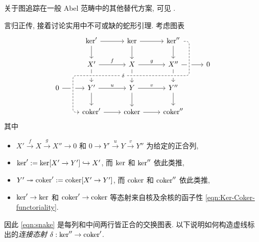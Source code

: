 关于图追踪在一般 Abel 范畴中的其他替代方案, 可见 \cite[Tag 05PL]{stacks}.

言归正传, 接着讨论实用中不可或缺的蛇形引理. 考虑图表
\begin{equation}\label{eqn:snake}\begin{tikzcd}
	& \Ker' \arrow[r] \arrow[d] & \Ker \arrow[r] \arrow[d] & \Ker'' \arrow[d] & \\
	& X' \arrow[d] \arrow[r, "f"]  & X \arrow[d] \arrow[r, "g"]  & X'' \arrow[r] \arrow[d, ""{coordinate, name=Z}] & 0  \\
	0 \arrow[r] & Y' \arrow[r, "u"] \arrow[d] & Y \arrow[r, "v"] \arrow[d] & Y'' \arrow[d] & \\
	& \Coker' \arrow[uuurr, "\delta" description, crossing over, dashed, leftarrow, rounded corners, to path= {-- ([xshift=-2ex]\tikztostart.west) |- (Z) [near end]\tikztonodes -| ([xshift=2ex]\tikztotarget.east) -- (\tikztotarget) } ] \arrow[r] & \Coker \arrow[r] & \Coker'' &
\end{tikzcd}\end{equation}
其中
\begin{itemize}
	\item $X' \xrightarrow{f} X \xrightarrow{g} X'' \to 0$ 和 $0 \to Y' \xrightarrow{u} Y \xrightarrow{v} Y''$ 为给定的正合列,
	\item $\operatorname{ker}' := \operatorname{ker}[X' \to Y'] \hookrightarrow X'$, 而 $\operatorname{ker}$ 和 $\operatorname{ker}''$ 依此类推,
	\item $Y' \twoheadrightarrow \operatorname{coker}' := \operatorname{coker}[X' \to Y']$, 而 $\operatorname{coker}$ 和 $\operatorname{coker}''$ 依此类推,
	\item $\operatorname{ker}' \to \operatorname{ker}$ 和 $\operatorname{coker}' \to \operatorname{coker}$ 等态射来自核及余核的函子性 \eqref{eqn:Ker-Coker-functoriality}.
\end{itemize}

因此 \eqref{eqn:snake} 是每列和中间两行皆正合的交换图表. 以下说明如何构造虚线标出的\emph{连接态射} $\delta: \operatorname{ker}'' \to \operatorname{coker}'$.

